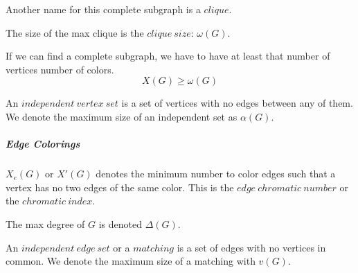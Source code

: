 \documentclass{article}
\begin{document}
Another name for this complete subgraph is a $clique$.

The size of the max clique is the $clique \ size$: $\omega\left(G\right)$.

If we can find a complete subgraph, we have to have at least that number of vertices number of colors.
\[X\left(G\right) \geq \omega\left(G\right)\]

An $independent \ vertex \ set$ is a set of vertices with no edges between any of them.
We denote the maximum size of an independent set as $\alpha\left(G\right)$.

\subparagraph{Edge Colorings}
$X_e\left(G\right)$ or $X'\left(G\right)$ denotes the minimum number to color edges such that
a vertex has no two edges of the same color. This is the $edge \ chromatic \ number$ or the $chromatic \ index$.

The max degree of $G$ is denoted $\Delta(G)$.

An $independent \ edge \ set$ or a $matching$ is a set of edges with no vertices in common.
We denote the maximum size of a matching with $v(G)$.
\end{document}
